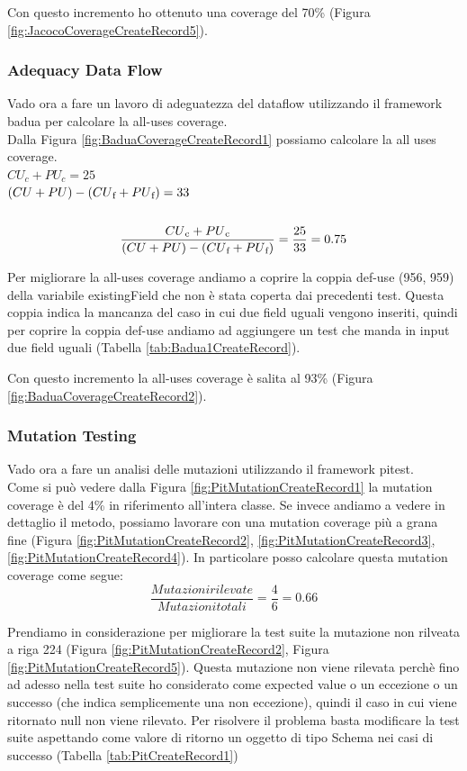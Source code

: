 \documentclass[12pt, a4paper]{article}
\begin{document}
Con questo incremento ho ottenuto una coverage del 70\% (Figura \ref{fig:JacocoCoverageCreateRecord5}).


\subsubsection{Adequacy Data Flow}

Vado ora a fare un lavoro di adeguatezza del dataflow utilizzando il framework badua per calcolare la all-uses coverage. \\
Dalla Figura \ref{fig:BaduaCoverageCreateRecord1} possiamo calcolare la all uses coverage. \\

\(CU_c + PU_c = 25\) \\
\( (CU + PU) - (CU\textsubscript{f} + PU\textsubscript{f}) = 33\) \\ \\
\[\frac{{CU\textsubscript{c} + PU\textsubscript{c}}}{{(CU + PU) - (CU\textsubscript{f} + PU\textsubscript{f})}} = \frac{{25}}{{33}} = 0.75\]

Per migliorare la all-uses coverage andiamo a coprire la coppia def-use (956, 959) della variabile existingField che non 
è stata coperta dai precedenti test. Questa coppia indica la mancanza del caso in cui due field uguali vengono inseriti, 
quindi per coprire la coppia def-use andiamo ad aggiungere un test che manda in input due field uguali 
(Tabella \ref{tab:Badua1CreateRecord}).

Con questo incremento la all-uses coverage è salita al 93\% (Figura \ref{fig:BaduaCoverageCreateRecord2}).
\subsubsection{Mutation Testing}

Vado ora a fare un analisi delle mutazioni utilizzando il framework pitest. \\
Come si può vedere dalla Figura \ref{fig:PitMutationCreateRecord1} la mutation coverage è del 4\% in riferimento 
all'intera classe. Se invece andiamo a vedere in dettaglio il metodo, possiamo lavorare con una mutation coverage 
più a grana fine (Figura \ref{fig:PitMutationCreateRecord2}, \ref{fig:PitMutationCreateRecord3}, \ref{fig:PitMutationCreateRecord4}).
In particolare posso calcolare questa mutation coverage come segue:
\[\frac{{Mutazioni rilevate}}{{Mutazioni totali}} = \frac{{4}}{{6}} = 0.66\]

Prendiamo in considerazione per migliorare la test suite la mutazione non rilveata a riga 224 
(Figura \ref{fig:PitMutationCreateRecord2}, Figura \ref{fig:PitMutationCreateRecord5}).
Questa mutazione non viene rilevata perchè fino ad adesso nella test suite ho considerato come expected value o un eccezione
o un successo (che indica semplicemente una non eccezione), quindi il caso in cui viene ritornato null non viene rilevato.
Per risolvere il problema basta modificare la test suite aspettando come valore di ritorno un oggetto di tipo Schema nei casi 
di successo (Tabella \ref{tab:PitCreateRecord1})
\end{document}

